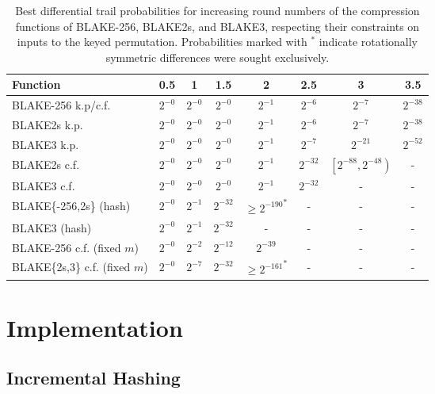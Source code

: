 \documentclass[11pt,notitlepage,a4paper]{article}
\begin{document}
\begin{table}[t]
  \centering
  \caption{Best differential trail probabilities for increasing round numbers of the compression functions of BLAKE-256, BLAKE2s, and BLAKE3, respecting their constraints on inputs to the keyed permutation. Probabilities marked with ${}^\ast$ indicate rotationally symmetric differences were sought exclusively.}%
  \label{tab:trails}
  \begin{tabular}{lccccccc}
    \toprule
    Function & 0.5   & 1     & 1.5   & 2     & 2.5   & 3     & 3.5 \\ \midrule
    BLAKE-256 k.p/c.f. & $2^{-0}$ & $2^{-0}$ & $2^{-0}$ & $2^{-1}$ & $2^{-6}$ & $2^{-7}$ & $2^{-38}$  \\
    BLAKE2s k.p. & $2^{-0}$ & $2^{-0}$ & $2^{-0}$ & $2^{-1}$ & $2^{-6}$ & $2^{-7}$ & $2^{-38}$  \\
    BLAKE3 k.p. & $2^{-0}$ & $2^{-0}$ & $2^{-0}$ & $2^{-1}$ & $2^{-7}$ & $2^{-21}$ & $2^{-52}$  \\
    BLAKE2s c.f.  &  $2^{-0}$  & $2^{-0}$ &  $2^{-0}$  & $2^{-1}$ & $2^{-32}$   & $\left[2^{-88}, 2^{-48}\right)$ & -  \\
    BLAKE3 c.f.   &  $2^{-0}$  & $2^{-0}$ &  $2^{-0}$  & $2^{-1}$ & $2^{-32}$   & - & -  \\
    BLAKE\{-256,2s\} (hash) & $2^{-0}$ & $2^{-1}$ & $2^{-32}$ & ${\ge 2^{-190}}^\ast$ & - & - & -  \\ %
    BLAKE3 (hash) & $2^{-0}$ & $2^{-1}$ & $2^{-32}$ & - & - & - & -  \\ 
    BLAKE-256 c.f. (fixed $m$) & $2^{-0}$ & $2^{-2}$ & $2^{-12}$ & $2^{-39}$ & - & - & - \\
    BLAKE\{2s,3\} c.f. (fixed $m$) & $2^{-0}$ & $2^{-7}$ & $2^{-32}$ & ${\ge 2^{-161}}^\ast$ & - & - & - \\ %
    \bottomrule
  \end{tabular}
\end{table}

\section{Implementation}\label{sec:implementation}

\subsection{Incremental Hashing}\label{sec:incremental}
\end{document}
